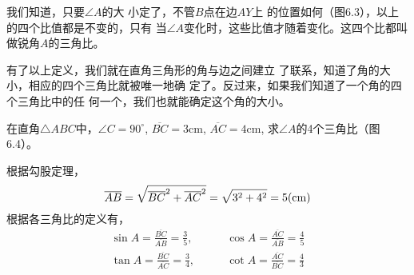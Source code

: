 我们知道，只要$\angle A$的大
小定了，不管$B$点在边$AY$上
的位置如何（图6.3），以上
的四个比值都是不变的，只有
当$\angle A$变化时，这些比值才随着变化。这四个比都叫做锐角$A$的三角比。

有了以上定义，我们就在直角三角形的角与边之间建立
了联系，知道了角的大小，相应的四个三角比就被唯一地确
定了。反过来，如果我们知道了一个角的四个三角比中的任
何一个，我们也就能确定这个角的大小。

\begin{example}
    在直角$\triangle ABC$中，$\angle C=90^{\circ}$, $\overline{BC}=3$cm, $\overline{AC}=
    4$cm, 求$\angle A$的4个三角比（图6.4）。
\end{example}

\begin{figure}[htp]\centering
    \begin{minipage}[t]{0.48\textwidth}
    \centering
{}
    \caption{}
    \end{minipage}
    \begin{minipage}[t]{0.48\textwidth}
    \centering
    \caption{}
    \end{minipage}
    \end{figure}

\begin{solution}
    根据勾股定理，
  \[  \overline{AB}=\sqrt{\overline{BC}^2+\overline{AC}^2}=\sqrt{3^2+4^2}=5{\rm (cm)}\]
  根据各三角比的定义有，
\[\begin{split}
    \sin A=\frac{\overline{BC}}{\overline{AB}}=\frac{3}{5},&\qquad \cos A=\frac{\overline{AC}}{\overline{AB}}=\frac{4}{5}\\
    \tan A=\frac{\overline{BC}}{\overline{AC}}=\frac{3}{4},&\qquad \cot A=\frac{\overline{AC}}{\overline{BC}}=\frac{4}{3}\\
\end{split}\]
\end{solution}


